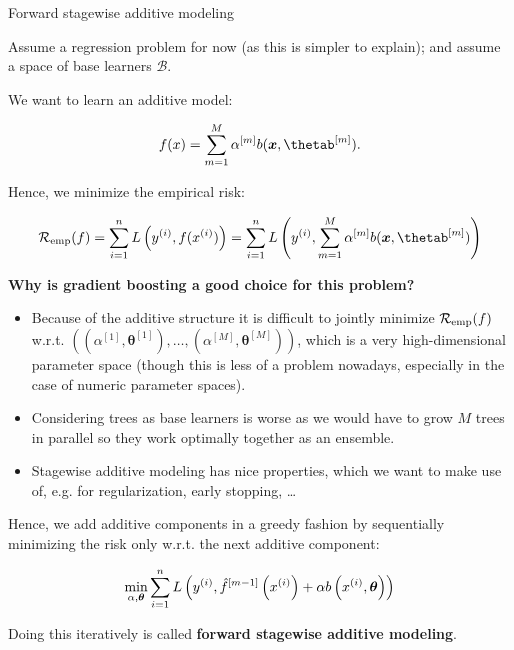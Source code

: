 \begin{vbframe}{Forward stagewise additive modeling}

Assume a regression problem for now (as this is simpler to explain);
and assume a space of base learners $\mathcal{B}$.

\lz



We want to learn an additive model:

$$
\fx = \sum_{m=1}^M \alpha^{[m]} \blxt.
$$

Hence, we minimize the empirical risk:

$$
\riskef = \sum_{i=1}^n L\left(\yi,\fxi \right) =
\sum_{i=1}^n L\left(\yi, \sum_{m=1}^M \alpha^{[m]} \blxt\right)
$$







\framebreak
\textbf{Why is gradient boosting a good choice for this problem?}
\begin{itemize}
\item Because of the additive structure it is difficult to jointly minimize $\mathcal{R}_{\text{emp}}(f)$ w.r.t. $\left(\left(\alpha^{[1]}, \bm{\theta}^{[1]}\right), \ldots, \left(\alpha^{[M]}, \bm{\theta}^{[M]}\right)\right)$, which is a very high-dimensional parameter space (though this is less of a problem nowadays, especially in the
case of numeric parameter spaces).
\item Considering trees as base learners is worse as we would have to grow $M$ trees in parallel so they
  work optimally together as an ensemble.
\item Stagewise additive modeling has nice properties, which we want to make use of, e.g. for regularization, early stopping, \dots
\end{itemize}

\framebreak

Hence, we add additive components in a greedy fashion by sequentially minimizing the risk only w.r.t. the next additive component:

$$ \min \limits_{\alpha, \bm{\theta}} \sum_{i=1}^n L\left(y^{(i)}, \hat{f}^{[m-1]}\left(x^{(i)}\right) + \alpha b\left(x^{(i)}, \bm{\theta}\right)\right) $$

\lz

Doing this iteratively is called \textbf{forward stagewise additive modeling}.



\end{vbframe}


